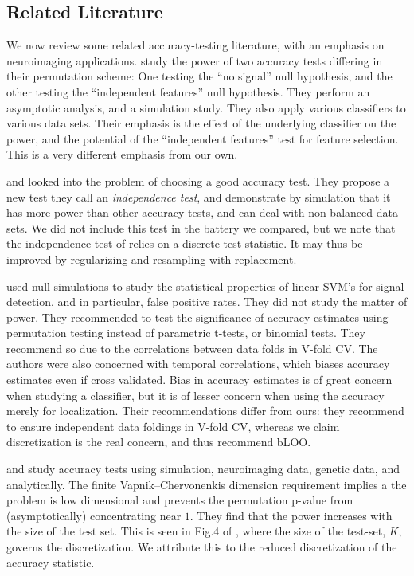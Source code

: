 \documentclass[12pt,a4paper]{article}
\begin{document}
\subsection{Related Literature}
We now review some related accuracy-testing literature, with an emphasis on neuroimaging applications.
\cite{ojala_permutation_2010} study the power of two accuracy tests differing in their permutation scheme:
One testing the ``no signal'' null hypothesis, and the other testing the ``independent features'' null hypothesis. 
They perform an asymptotic analysis, and a simulation study. 
They also apply various classifiers to various data sets. 
Their emphasis is the effect of the underlying classifier on the power, and the potential of the ``independent features'' test for feature selection.
This is a very different emphasis from our own.


\cite{olivetti_induction_2012} and \cite{olivetti_statistical_2014} looked into the problem of choosing a good accuracy test. 
They propose a new test they call an \emph{independence test}, and demonstrate by simulation that it has more power than other accuracy tests, and can deal with non-balanced data sets. 
We did not include this test in the battery we compared, but we note that the independence test of \cite{olivetti_induction_2012} relies on a discrete test statistic. 
It may thus be improved by regularizing and resampling with replacement. 


\cite{schreiber2013statistical} used null simulations to study the statistical properties of linear SVM's for signal detection, and in particular, false positive rates. 
They did not study the matter of power.
They recommended to test the significance of accuracy estimates using permutation testing instead of parametric t-tests, or binomial tests.
They recommend so due to the correlations between data folds in V-fold CV.
The authors were also concerned with temporal correlations, which biases accuracy estimates even if cross validated. 
Bias in accuracy estimates is of great concern when studying a classifier, but it is of lesser concern when using the accuracy merely for localization. 
Their recommendations differ from ours: they recommend to ensure independent data foldings in V-fold CV, whereas we claim discretization is the real concern, and thus recommend bLOO.

\cite{golland_permutation_2003} and \cite{golland_permutation_2005} study accuracy tests using simulation, neuroimaging data, genetic data, and analytically.
The finite Vapnik–Chervonenkis dimension requirement \citep[Sec 4.3]{golland_permutation_2005} implies a the problem is low dimensional and prevents the permutation p-value from (asymptotically) concentrating near $1$. 
They find that the power increases with the size of the test set.
This is seen in Fig.4 of \citet{golland_permutation_2005}, where the size of the test-set, $K$, governs the discretization. 
We attribute this to the reduced discretization of the accuracy statistic.
\end{document}
